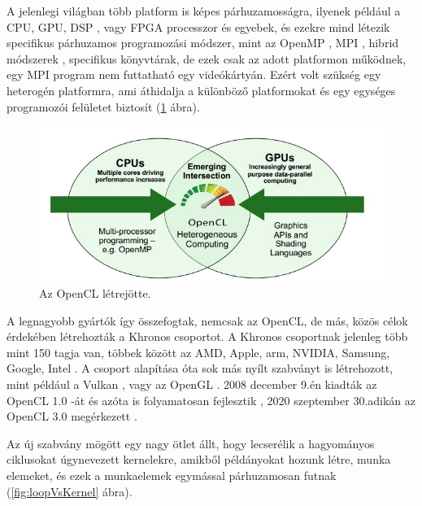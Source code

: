 

A jelenlegi világban több platform is képes párhuzamosságra, ilyenek például a CPU, GPU, DSP \cite{dsp}, vagy FPGA \cite{fpga} processzor és egyebek, és ezekre mind létezik specifikus párhuzamos programozási módszer, mint az OpenMP \cite{openmp}, MPI \cite{mpi}, hibrid módszerek \cite{hybrid}, specifikus könyvtárak, de ezek csak az adott platformon működnek, egy MPI program nem futtatható egy videókártyán. Ezért volt szükség egy heterogén platformra, ami áthidalja a különböző platformokat és egy egységes programozói felületet biztosít (\ref{fig:openCl} ábra).

\begin{figure}[h]
\centering
\includegraphics[scale=0.7]{images/opencl_origin.jpg}
\caption{Az OpenCL létrejötte. \cite{opencl_origin}}
\label{fig:openCl}
\end{figure}

A legnagyobb gyártók így összefogtak, nemcsak az OpenCL, de más, közös célok érdekében létrehozták a Khronos csoportot. A Khronos csoportnak jelenleg több mint 150 tagja van, többek között az AMD, Apple, arm, NVIDIA, Samsung, Google, Intel \cite{khronos_about} \cite{khronos_members}. A csoport alapítása óta sok más nyílt szabványt is létrehozott, mint például a Vulkan \cite{vulkan}, vagy az OpenGL \cite{opengl}. 2008 december 9.én kiadták az OpenCL 1.0 -át és azóta is folyamatosan fejlesztik \cite{opencl1}, 2020 szeptember 30.adikán az OpenCL 3.0 megérkezett \cite{opencl}.

Az új szabvány mögött egy nagy ötlet állt, hogy lecserélik a hagyományos ciklusokat úgynevezett kernelekre, amikből példányokat hozunk létre, munka elemeket, és ezek a munkaelemek egymással párhuzamosan futnak (\ref{fig:loopVsKernel} ábra).

